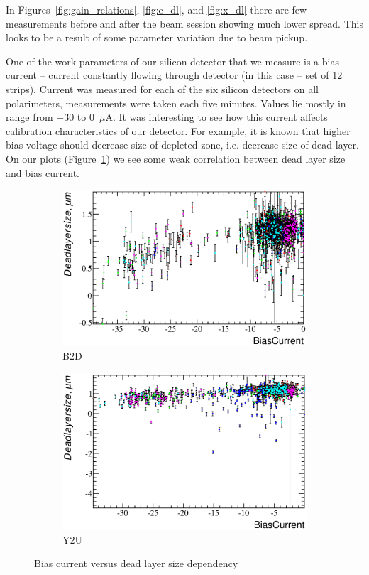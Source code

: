 \documentclass[a4paper,12pt]{article}
\begin{document}
In Figures~\ref{fig:gain_relations}, \ref{fig:e_dl}, and \ref{fig:x_dl} there
are few measurements before and after the beam session showing much lower
spread. This looks to be a result of some parameter variation due to beam
pickup.

One of the work parameters of our silicon detector that we measure is a bias
current -- current constantly flowing through detector (in this case -- set of
12 strips). Current was measured for each of the six silicon detectors on all
polarimeters, measurements were taken each five minutes. Values lie mostly in
range from $-30$ to $0$~$\mu\text{A}$. It was interesting to see how this current
affects calibration characteristics of our detector. For example, it is known
that higher bias voltage should decrease size of depleted zone, i.e. decrease
size of dead layer. On our plots (Figure~\ref{fig:bc_vs_xdl}) we see some weak
correlation between dead layer size and bias current.

\newcommand\bcvsxdllabel{Bias current versus dead layer size dependency}
\begin{figure}[p]
\begin{subfigure}[t]{0.5\textwidth}
\includegraphics[width=\textwidth]{gfx/run13_alpha_study/B2D/c_hBiasCurrent_DeadLayerSize.eps}
\caption{B2D}
\end{subfigure}
%
\begin{subfigure}[t]{0.5\textwidth}
\includegraphics[width=\textwidth]{gfx/run13_alpha_study/Y2U/c_hBiasCurrent_DeadLayerSize.eps}
\caption{Y2U}
\end{subfigure}
\caption{\bcvsxdllabel}
\label{fig:bc_vs_xdl}
\end{figure}
\end{document}
